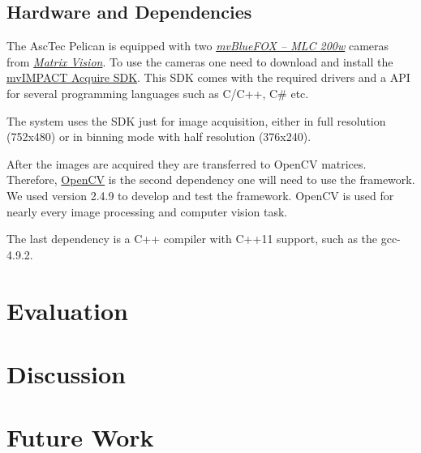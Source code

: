 \documentclass[11pt]{article}
\begin{document}
\subsection{Hardware and Dependencies}  
The AscTec Pelican is equipped with two  \emph{\href{http://www.matrix-vision.com/USB2.0-single-board-camera-mvbluefox-mlc.html?camera=mvBlueFOX-MLC200wC&selectInterface=Alle&selectMpixels=Alle&selectFps=Alle&selectSensor=Alle&selectColor=Alle&selectSize=Alle&selectShutter=Alle&selectModel=Alle&col=1&row=0}{mvBlueFOX -- MLC 200w}} cameras from \emph{\href{http://www.matrix-vision.com/home-en.html}{Matrix Vision}}. To use the cameras one need to download and install the \href{http://www.matrix-vision.com/programming-interface-mvimpact-acquire.html}{mvIMPACT Acquire SDK}. This SDK comes with the required drivers and a API for several programming languages such as C/C++, C\# etc. 

The system uses the SDK just for image acquisition, either in full resolution (752x480) or in binning mode with half resolution (376x240).

After the images are acquired they are transferred to OpenCV matrices. Therefore, \href{http://opencv.org/}{OpenCV} is the second dependency one will need to use the framework. We used version 2.4.9 to develop and test the framework. OpenCV is used for nearly every image processing and computer vision task.

The last dependency is a C++ compiler with C++11 support, such as the gcc-4.9.2.


\section{Evaluation}
\section{Discussion}
\section{Future Work}
\end{document}

